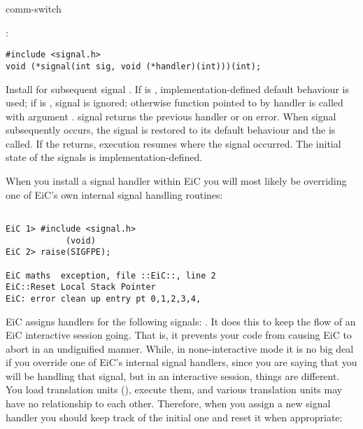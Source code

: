 \begin{Ventry2}{comm-switch  }

\item[signal]
\label{item:signal}
:
\begin{production}
\begin{verbatim}
#include <signal.h>
void (*signal(int sig, void (*handler)(int)))(int);
\end{verbatim}
\end{production}

     Install  for subsequent signal . If 
     is , implementation-defined default behaviour is
     used; if  is , signal is ignored;
     otherwise function pointed to by handler is called with argument
     . signal returns the previous handler or  on
     error.  When signal  subsequently occurs, the signal is
     restored to its default behaviour and the  is
     called. If the  returns, execution resumes where the
     signal occurred. The initial state of the signals is
     implementation-defined.


     When you install a signal handler  within EiC you will most likely be overriding one of
EiC's own internal signal handling routines:

\begin{production}
\begin{verbatim}

EiC 1> #include <signal.h>
        	(void)
EiC 2> raise(SIGFPE);

EiC maths  exception, file ::EiC::, line 2
EiC::Reset Local Stack Pointer
EiC: error clean up entry pt 0,1,2,3,4,

\end{verbatim}
\end{production}
	

	EiC assigns handlers for the following signals: .  It does this to keep the
flow of an EiC interactive session going. That is, it prevents your
code from causing EiC to abort in an undignified manner. While, in
none-interactive mode it is no big deal if you override one of EiC's
internal signal handlers, since you are saying that you will be
handling that signal, but in an interactive session, things are
different. You load translation units (),
execute them, and various translation units may have no
relationship to each other. Therefore, when you assign a new signal handler
you should keep track of the initial one and reset it when appropriate:


\end{Ventry2}
